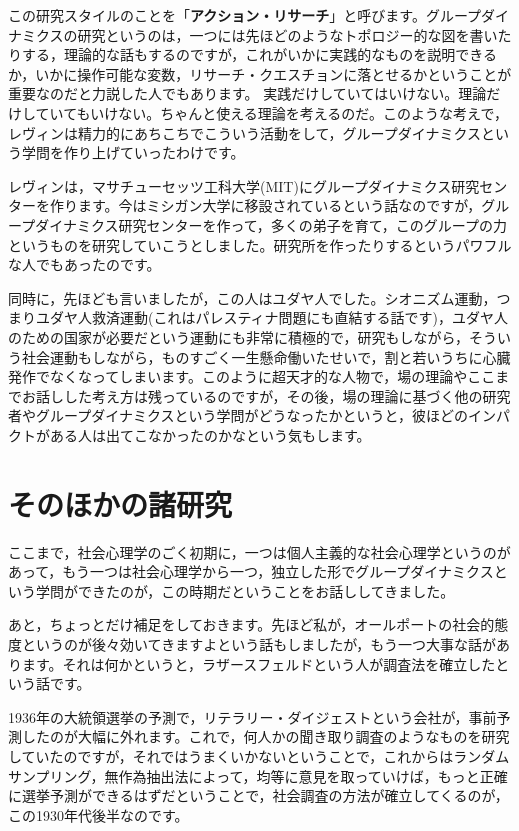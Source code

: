 \documentclass{ltjsbook}
\begin{document}
この研究スタイルのことを「\textbf{アクション・リサーチ}」と呼びます。グループダイナミクスの研究というのは，一つには先ほどのようなトポロジー的な図を書いたりする，理論的な話もするのですが，これがいかに実践的なものを説明できるか，いかに操作可能な変数，リサーチ・クエスチョンに落とせるかということが重要なのだと力説した人でもあります。
実践だけしていてはいけない。理論だけしていてもいけない。ちゃんと使える理論を考えるのだ。このような考えで，レヴィンは精力的にあちこちでこういう活動をして，グループダイナミクスという学問を作り上げていったわけです。

レヴィンは，マサチューセッツ工科大学(MIT)にグループダイナミクス研究センターを作ります。今はミシガン大学に移設されているという話なのですが，グループダイナミクス研究センターを作って，多くの弟子を育て，このグループの力というものを研究していこうとしました。研究所を作ったりするというパワフルな人でもあったのです。

同時に，先ほども言いましたが，この人はユダヤ人でした。シオニズム運動，つまりユダヤ人救済運動(これはパレスティナ問題にも直結する話です)，ユダヤ人のための国家が必要だという運動にも非常に積極的で，研究もしながら，そういう社会運動もしながら，ものすごく一生懸命働いたせいで，割と若いうちに心臓発作でなくなってしまいます。このように超天才的な人物で，場の理論やここまでお話しした考え方は残っているのですが，その後，場の理論に基づく他の研究者やグループダイナミクスという学問がどうなったかというと，彼ほどのインパクトがある人は出てこなかったのかなという気もします。

\section{そのほかの諸研究}

ここまで，社会心理学のごく初期に，一つは個人主義的な社会心理学というのがあって，もう一つは社会心理学から一つ，独立した形でグループダイナミクスという学問ができたのが，この時期だということをお話ししてきました。

あと，ちょっとだけ補足をしておきます。先ほど私が，オールポートの社会的態度というのが後々効いてきますよという話もしましたが，もう一つ大事な話があります。それは何かというと，ラザースフェルドという人が調査法を確立したという話です。

1936年の大統領選挙の予測で，リテラリー・ダイジェストという会社が，事前予測したのが大幅に外れます。これで，何人かの聞き取り調査のようなものを研究していたのですが，それではうまくいかないということで，これからはランダムサンプリング，無作為抽出法によって，均等に意見を取っていけば，もっと正確に選挙予測ができるはずだということで，社会調査の方法が確立してくるのが，この1930年代後半なのです。
\end{document}

